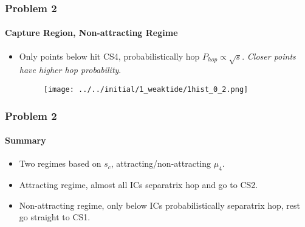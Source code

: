 \documentclass[dvipsnames, 11pt]{beamer}
\begin{document}
\begin{frame}
    \frametitle{Problem 2}
    \framesubtitle{Capture Region, Non-attracting Regime}

    \begin{itemize}
        \item Only points below hit CS4, probabilistically hop $P_{hop} \propto
            \sqrt{s}$. \emph{Closer points have higher hop probability}.

        \begin{figure}[t]
            \centering
            \texttt{[image: ../../initial/1\_weaktide/1hist\_0\_2.png]}
        \end{figure}
    \end{itemize}
\end{frame}

\begin{frame}
    \frametitle{Problem 2}
    \framesubtitle{Summary}

    \begin{itemize}
        \item Two regimes based on $s_c$, attracting/non-attracting $\mu_4$.

        \item Attracting regime, almost all ICs separatrix hop and go to CS2.

        \item Non-attracting regime, only below ICs probabilistically separatrix
            hop, rest go straight to CS1.
    \end{itemize}
\end{frame}
\end{document}
